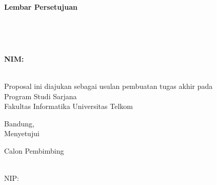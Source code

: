 {\centering
\textbf{\large Lembar Persetujuan}\\
\vspace{0.5cm}

\textbf{\Title}\\
\vspace{0.5cm}

\textbf{\textit{\EngTitle}}\\
\vspace{0.5cm}

\textbf{NIM: \NIM}\\
\textbf{\Author}\\
\vspace{1cm}

{Proposal ini diajukan sebagai usulan pembuatan tugas akhir pada\\
Program Studi Sarjana \Prodi\\
Fakultas Informatika Universitas Telkom}

\vspace{0.5cm}

{Bandung, \Tanggal\quad \Bulan \quad \Date}\\
{Menyetujui}

\vspace{0.5cm}

\begin{center}
Calon Pembimbing
\end{center}

\begin{center}
\vspace{2cm}

\underline{\PembimbingSatu} \\ 
NIP: \NIPPembimbingSatu

\end{center}

\vspace{0.5cm}

}